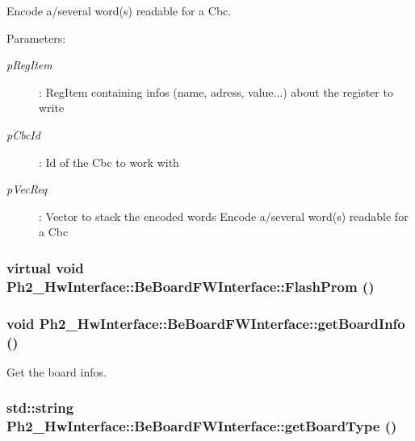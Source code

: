 Encode a/several word(s) readable for a Cbc. 

\begin{Desc}
\item[Parameters:]
\begin{description}
\item[{\em p\-Reg\-Item}]: Reg\-Item containing infos (name, adress, value...) about the register to write \item[{\em p\-Cbc\-Id}]: Id of the Cbc to work with \item[{\em p\-Vec\-Req}]: Vector to stack the encoded words Encode a/several word(s) readable for a Cbc \end{description}
\end{Desc}
\hypertarget{class_ph2___hw_interface_1_1_be_board_f_w_interface_d19ee1309003c559db472046af4620d5}{
\subsubsection[FlashProm]{\setlength{\rightskip}{0pt plus 5cm}virtual void Ph2\_\-Hw\-Interface::Be\-Board\-FWInterface::Flash\-Prom ()}}
\label{class_ph2___hw_interface_1_1_be_board_f_w_interface_d19ee1309003c559db472046af4620d5}


\hypertarget{class_ph2___hw_interface_1_1_be_board_f_w_interface_717caf9d29d3a7e92efceae18ad1dd78}{
\subsubsection[getBoardInfo]{\setlength{\rightskip}{0pt plus 5cm}void Ph2\_\-Hw\-Interface::Be\-Board\-FWInterface::get\-Board\-Info ()}}
\label{class_ph2___hw_interface_1_1_be_board_f_w_interface_717caf9d29d3a7e92efceae18ad1dd78}


Get the board infos. 

\hypertarget{class_ph2___hw_interface_1_1_be_board_f_w_interface_895bb5ac8dfb81a00a047a6d8f5281b2}{
\subsubsection[getBoardType]{\setlength{\rightskip}{0pt plus 5cm}std::string Ph2\_\-Hw\-Interface::Be\-Board\-FWInterface::get\-Board\-Type ()}}
\label{class_ph2___hw_interface_1_1_be_board_f_w_interface_895bb5ac8dfb81a00a047a6d8f5281b2}


